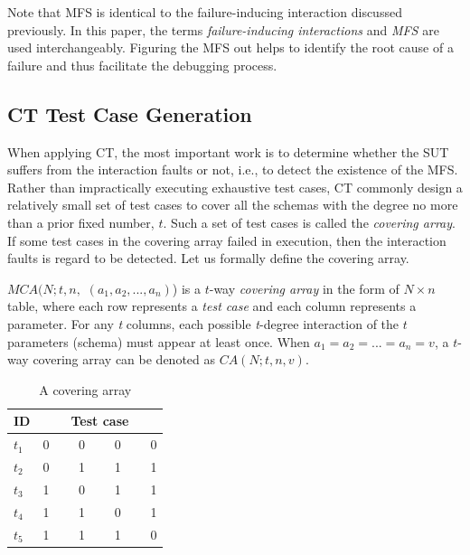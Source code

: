 \documentclass[10pt,journal,compsoc]{IEEEtran}
\begin{document}
Note that MFS is identical to the failure-inducing interaction discussed previously. In this paper, the terms \emph{failure-inducing interactions} and \emph{MFS} are used interchangeably. Figuring the MFS out helps to identify the root cause of a failure and thus facilitate the debugging process.



\subsection{CT Test Case Generation}\label{sec:back:gen}
When applying CT, the most important work is to determine whether the SUT suffers from the interaction faults or not, i.e., to  detect the existence of the MFS. Rather than impractically executing exhaustive test cases, CT commonly design a relatively small set of test cases to cover all the schemas with the degree no more than a prior fixed number, $t$. Such a set of test cases is called the \emph{covering array}.  If some test cases in the covering array failed in execution, then the interaction faults is regard to be detected. Let us formally define the covering array.

\begin{definition} $MCA(N; t, n,$ $(a_{1}, a_{2}, ..., a_{n})$) is a $t$-way \emph{covering array} in the form of $N \times n$ table, where each row represents a \emph{test case} and each column represents a parameter.  For any \emph{t} columns, each possible \emph{t}-degree interaction of the $t$ parameters (schema) must appear at least once. When $ a_{1} = a_{2} = ... = a_{n} = v $, a $t$-way covering array can be denoted as $CA(N; t, n, v)$.
\end{definition}

\begin{table}[!ht]
\renewcommand{\arraystretch}{1.3}
\caption{A covering array}
\label{ca_example}
\centering
\begin{tabular}{l|llll}
 \hline
ID &\multicolumn{4}{c}{\bfseries Test case} \\  \hline
$t_{1}$ &\multicolumn{4}{l}{0  \ \ \ \  0 \ \ \ \  0 \ \ \ \ 0} \\
$t_{2}$ &\multicolumn{4}{l}{0  \ \ \ \  1 \ \ \ \  1 \ \ \ \ 1} \\
$t_{3}$ &\multicolumn{4}{l}{1  \ \ \ \  0 \ \ \ \  1 \ \ \ \ 1} \\
$t_{4}$ &\multicolumn{4}{l}{1  \ \ \ \  1 \ \ \ \  0 \ \ \ \ 1} \\
$t_{5}$ &\multicolumn{4}{l}{1  \ \ \ \  1 \ \ \ \  1 \ \ \ \ 0} \\
 \hline
\end{tabular}
\end{table}
\end{document}

